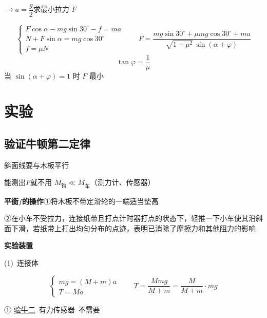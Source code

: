 \begin{problem}[5]

$\to a=\dfrac{g}{2}$\quad 求最小拉力 $F$
\begin{solution}
\[\left\{\begin{array}{l}F\cos\alpha-mg\sin30^\circ-f=ma\\ N+F\sin\alpha=mg\cos30^\circ\\ f=\mu N\end{array}\right.\qquad F=\frac{mg\sin30^\circ+\mu mg\cos30^\circ+ma}{\sqrt{1+\mu^2}\,\sin(\alpha+\varphi)}\]
\[\tan\varphi=\frac{1}{\mu}\]
当 $\sin(\alpha+\varphi)=1$ 时 $F$ 最小
\end{solution}
\end{problem}


\section{实验}
\subsection{验证牛顿第二定律}
斜面线要与木板平行 %

能测出$F$就不用 $M_{\text{钩}}\ll M_{\text{车}}$（测力计、传感器）


\textbf{平衡$f$的操作}\quad ①将木板不带定滑轮的一端适当垫高

\hspace{5em}②在小车不受拉力，连接纸带且打点计时器打点的状态下，轻推一下小车使其沿斜面下滑，若纸带上打出均匀分布的点迹，表明已消除了摩擦力和其他阻力的影响

\textbf{实验装置}

(1)\ 连接体


\[
\begin{cases} mg=(M+m)a\\ T=Ma\end{cases}\qquad T=\frac{Mmg}{M+m}=\frac{M}{M+m}\cdot mg
\]


① \underline{验牛二}\ \quad 有力传感器\ 不需要

